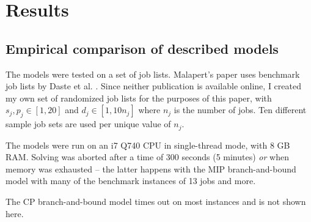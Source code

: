 \newpage
\chapter{Results}
\section{Empirical comparison of described models}
The models were tested on a set of job lists. Malapert's paper uses benchmark
job lists by Daste et al. \cite{daste1, daste2}. Since neither publication is
available online, I created my own set of randomized job lists for the purposes
of this paper, with $s_j, p_j \in [1, 20]$ and $d_j \in [1, 10n_j]$ where $n_j$ is
the number of jobs. Ten different sample job sets are used per unique value of
$n_j$.

The models were run on an i7 Q740 CPU in single-thread mode, with 8 GB RAM. Solving was aborted
after a time of 300 seconds (5 minutes) \textit{or} when memory was exhausted --
the latter happens with the MIP branch-and-bound model with many of the
benchmark instances of 13 jobs and more.

The CP branch-and-bound model times out on most instances and is not shown here.



